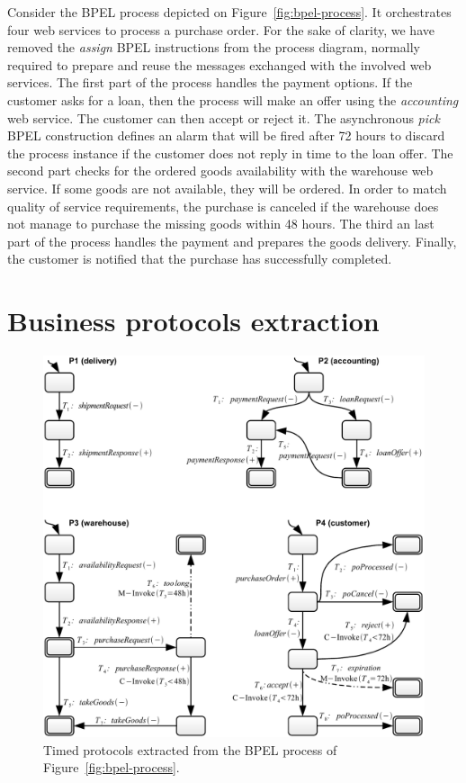 Consider the BPEL process depicted on Figure~\ref{fig:bpel-process}. It orchestrates four web services to process a purchase order. For the sake of clarity, we have removed the \emph{assign} BPEL instructions from the process diagram, normally required to prepare and reuse the messages exchanged with the involved web services. The first part of the process handles the payment options. If the customer asks for a loan, then the process will make an offer using the \emph{accounting} web service. The customer can then accept or reject it. The asynchronous \emph{pick} BPEL construction defines an alarm that will be fired after 72 hours to discard the process instance if the customer does not reply in time to the loan offer. The second part checks for the ordered goods availability with the warehouse web service. If some goods are not available, they will be ordered. In order to match quality of service requirements, the purchase is  canceled if the warehouse does not manage to purchase the missing goods within 48 hours. The third an last part of the process handles the payment and prepares the goods delivery. Finally, the customer is notified that the purchase has successfully completed.


\section{Business protocols extraction}


\begin{figure}[tbhp]
    \centering
    \includegraphics[width=\textwidth]{content/sample-usecase/bpel-protocols}
    \caption{Timed protocols extracted from the BPEL process of Figure~\ref{fig:bpel-process}.}
    \label{fig:bpel-protocols}
\end{figure}


